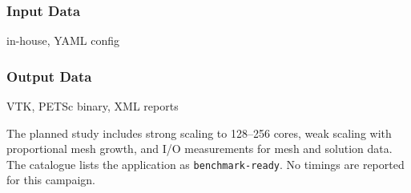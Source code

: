 \subsubsection{Input Data}
in-house, YAML config

\subsubsection{Output Data}
VTK, PETSc binary, XML reports

The planned study includes strong scaling to 128--256 cores, weak
scaling with proportional mesh growth, and I/O measurements for mesh
and solution data. The catalogue lists the application as
\texttt{benchmark-ready}. No timings are reported for this campaign.
